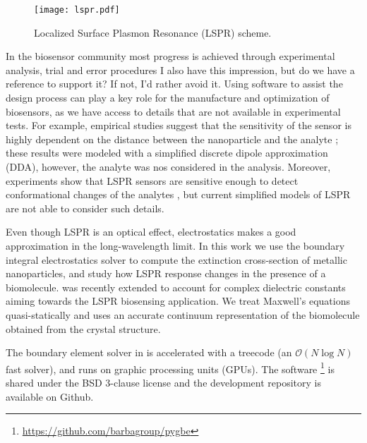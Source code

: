 \begin{figure}[h] %
   \centering
   \texttt{[image: lspr.pdf]} 
   \caption{Localized Surface Plasmon Resonance (LSPR) scheme. }
   \label{fig:lspr}
\end{figure}


In the biosensor community most progress is achieved 
through experimental analysis, trial and error procedures {\color{blue} I also have this impression, but do we have a reference to support it? If not, I'd rather avoid it}. 
Using software to assist the design process can play a key role for the manufacture and optimization
of biosensors, as we have access to details that are not available in experimental tests.
For example, empirical studies suggest that the sensitivity of the sensor
is highly dependent on the distance between the nanoparticle and the analyte \cite{HaesETal2004};
these results were modeled with a simplified discrete dipole approximation (DDA), however, 
the analyte was nos considered in the analysis. Moreover, experiments show that 
LSPR sensors are sensitive enough to detect conformational changes of the analytes \cite{HallETal2011}, 
but current simplified models of LSPR are not able to consider such details.


Even though LSPR is an optical effect, electrostatics 
makes a good approximation in the long-wavelength limit. In this work we use
the boundary integral electrostatics solver \pygbe \cite{CooperETal2016} 
to compute the extinction cross-section of metallic nanoparticles, and study how LSPR 
response changes in the presence
of a biomolecule. \pygbe was recently extended to account for complex dielectric constants 
\cite{ClementiETal2017} aiming towards the LSPR biosensing application. We treat Maxwell's
equations quasi-statically \cite{MayergoyzZhang2007} and
uses an accurate continuum representation of the biomolecule obtained from the 
crystal structure. 

The boundary element solver in \pygbe
is accelerated with a treecode (an $\mathcal{O}(N\log N)$ fast solver), and runs on
graphic processing units (GPUs). The software
\footnote{\url{https://github.com/barbagroup/pygbe}} is shared under the 
BSD 3-clause license and the development repository is available on Github.

